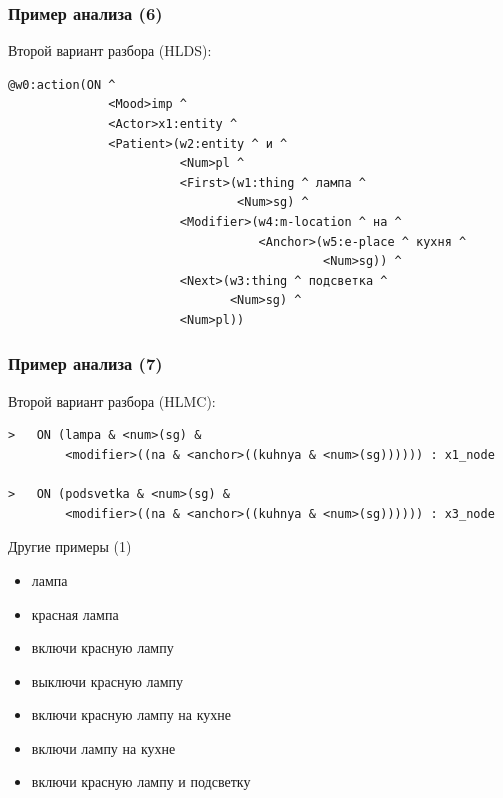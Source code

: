 \documentclass{beamer}
\begin{document}
\begin{frame}[fragile]
\frametitle{Пример анализа (6)}
Второй вариант разбора (HLDS):\\
\bigskip
\begin{center}
{\scriptsize \begin{verbatim}
@w0:action(ON ^ 
              <Mood>imp ^ 
              <Actor>x1:entity ^ 
              <Patient>(w2:entity ^ и ^ 
                        <Num>pl ^ 
                        <First>(w1:thing ^ лампа ^ 
                                <Num>sg) ^ 
                        <Modifier>(w4:m-location ^ на ^ 
                                   <Anchor>(w5:e-place ^ кухня ^ 
                                            <Num>sg)) ^ 
                        <Next>(w3:thing ^ подсветка ^ 
                               <Num>sg) ^ 
                        <Num>pl))
\end{verbatim}
}                        
\end{center}
\end{frame}

\begin{frame}[fragile]
\frametitle{Пример анализа (7)}
Второй вариант разбора (HLMC):\\
\bigskip
\begin{center}
{\scriptsize \begin{verbatim}
>   ON (lampa & <num>(sg) & 
        <modifier>((na & <anchor>((kuhnya & <num>(sg)))))) : x1_node 

>   ON (podsvetka & <num>(sg) & 
        <modifier>((na & <anchor>((kuhnya & <num>(sg)))))) : x3_node 
\end{verbatim}
}                        
\end{center}
\end{frame}

\begin{frame}{Другие примеры (1)}
\begin{itemize}
	\item лампа
	\item красная лампа
	\item включи красную лампу
	\item выключи красную лампу
	\item включи красную лампу на кухне
	\item включи лампу на кухне
	\item включи красную лампу и подсветку
\end{itemize}
\end{frame}
\end{document}
